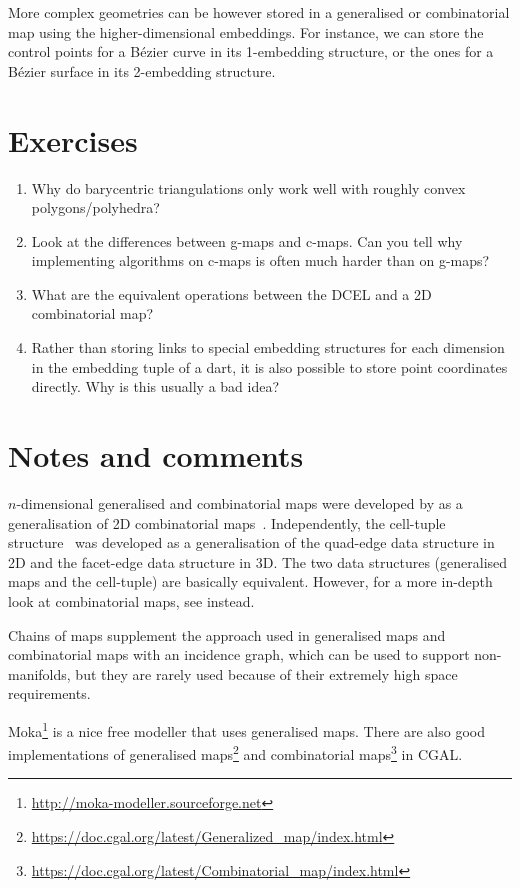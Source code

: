 More complex geometries can be however stored in a generalised or combinatorial map using the higher-dimensional embeddings.
For instance, we can store the control points for a B\'ezier curve in its 1-embedding structure, or the ones for a B\'ezier surface in its 2-embedding structure.

%
\section{Exercises}

\begin{enumerate}
	\item Why do barycentric triangulations only work well with roughly convex polygons/polyhedra?
	\item Look at the differences between g-maps and c-maps. Can you tell why implementing algorithms on c-maps is often much harder than on g-maps?
	\item What are the equivalent operations between the DCEL and a 2D combinatorial map?
	\item Rather than storing links to special embedding structures for each dimension in the embedding tuple of a dart, it is also possible to store point coordinates directly. Why is this usually a bad idea?
\end{enumerate}



%
\section{Notes and comments}

\(n\)-dimensional generalised and combinatorial maps were developed by \citet{Lienhardt94} as a generalisation of 2D combinatorial maps~\citep{Edmonds60}.
Independently, the cell-tuple structure~\citep{Brisson89} was developed as a generalisation of the quad-edge \citep{Guibas85} data structure in 2D and the facet-edge data structure \citep{Dobkin87} in 3D.
The two data structures (generalised maps and the cell-tuple) are basically equivalent.
However, for a more in-depth look at combinatorial maps, see \citet{Damiand14} instead.

Chains of maps \citep{Elter94} supplement the approach used in generalised maps and combinatorial maps with an incidence graph, which can be used to support non-manifolds, but they are rarely used because of their extremely high space requirements.

Moka\footnote{\url{http://moka-modeller.sourceforge.net}} is a nice free modeller that uses generalised maps.
There are also good implementations of generalised maps\footnote{\url{https://doc.cgal.org/latest/Generalized_map/index.html}} and combinatorial maps\footnote{\url{https://doc.cgal.org/latest/Combinatorial_map/index.html}} in CGAL\@.

